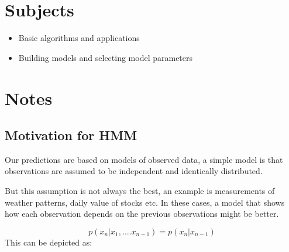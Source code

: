 


    \section{Subjects}
    \begin{itemize}
        \item Basic algorithms and applications
        \item Building models and selecting model parameters
    \end{itemize}
    
    \section{Notes}
    
    \subsection{Motivation for HMM}
    
    Our predictions are based on models of observed data, a simple model is 
    that observations are assumed to be independent and identically distributed.
    
    
    But this assumption is not always the best, an example is measurements of 
    weather patterns, daily value of stocks etc. In these cases, a model that 
    shows how each observation depends on the previous observations might be 
    better.
    
    \begin{equation*}
        p(x_n|x_1,\dots.x_{n-1})=p(x_n|x_{n-1})
    \end{equation*}
     This can be depicted as:
    
    
